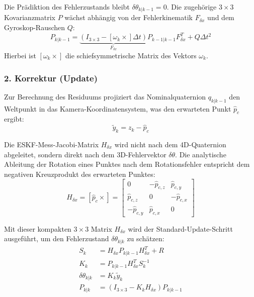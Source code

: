 \documentclass{article}
\begin{document}
Die Prädiktion des Fehlerzustands bleibt $\delta \theta_{k|k-1} = 0$. Die zugehörige $3 \times 3$ Kovarianzmatrix $P$ wächst abhängig von der Fehlerkinematik $F_{\delta x}$ und dem Gyroskop-Rauschen $Q$:
\begin{equation}
    P_{k|k-1} = \underbrace{\left(I_{3\times3} - [\omega_k \times] \Delta t\right)}_{F_{\delta x}} P_{k-1|k-1} F_{\delta x}^T + Q \Delta t^2
\end{equation}
Hierbei ist $[\omega_k \times]$ die schiefsymmetrische Matrix des Vektors $\omega_k$.



\subsubsection{2. Korrektur (Update)}
Zur Berechnung des Residuums projiziert das Nominalquaternion $q_{k|k-1}$ den Weltpunkt in das Kamera-Koordinatensystem, was den erwarteten Punkt $\hat{p}_c$ ergibt:
\begin{equation}
    \tilde{y}_k = z_k - \hat{p}_c
\end{equation}

Die ESKF-Mess-Jacobi-Matrix $H_{\delta x}$ wird nicht nach dem 4D-Quaternion abgeleitet, sondern direkt nach dem 3D-Fehlervektor $\delta \theta$. Die analytische Ableitung der Rotation eines Punktes nach dem Rotationsfehler entspricht dem negativen Kreuzprodukt des erwarteten Punktes:
\begin{equation}
    H_{\delta x} = [\hat{p}_c \times] = \begin{bmatrix} 0 & -\hat{p}_{c,z} & \hat{p}_{c,y} \\ \hat{p}_{c,z} & 0 & -\hat{p}_{c,x} \\ -\hat{p}_{c,y} & \hat{p}_{c,x} & 0 \end{bmatrix}
\end{equation}

Mit dieser kompakten $3 \times 3$ Matrix $H_{\delta x}$ wird der Standard-Update-Schritt ausgeführt, um den Fehlerzustand $\delta \theta_{k|k}$ zu schätzen:
\begin{align}
    S_k &= H_{\delta x} P_{k|k-1} H_{\delta x}^T + R \\
    K_k &= P_{k|k-1} H_{\delta x}^T S_k^{-1} \\
    \delta \theta_{k|k} &= K_k \tilde{y}_k \\
    P_{k|k} &= (I_{3\times3} - K_k H_{\delta x}) P_{k|k-1}
\end{align}
\end{document}
